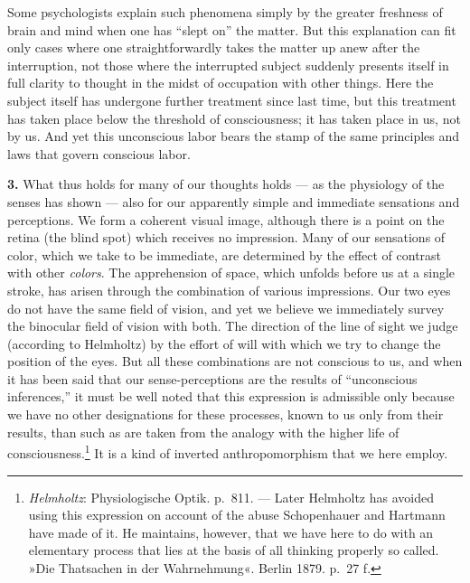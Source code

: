 \documentclass[12pt,a4paper]{book}
\newcommand{\opage}[1]{\marginnote{\footnotesize\textit{[#1]}}}
\begin{document}
Some psychologists explain such phenomena simply by the greater freshness
of brain and mind when one has ``slept on'' the matter. But this
explanation can fit only cases where one straightforwardly takes the
matter up anew after the interruption, not those where the interrupted
subject suddenly presents itself in full clarity to thought in the midst
of occupation with other things. Here the subject itself has undergone
further treatment since last time, but this treatment has taken place
below the threshold of consciousness; it has taken place in us, not by
us. And yet this unconscious labor bears the stamp of the same principles
and laws that govern conscious labor.

\textbf{3.} What thus holds for many of our thoughts holds --- as the
physiology of the senses has shown --- also for our apparently simple and
immediate sensations and perceptions. We form a coherent visual image,
although there is a point on the retina (the blind spot) which receives
no impression. Many of our sensations of color, which we take to be
immediate, are determined by the effect of contrast with other
\emph{colors}. The apprehension of space, which unfolds before us at a
single stroke, has arisen through the combination of various impressions.
Our two eyes do not have the same field of vision, and yet we believe we
immediately survey the binocular field of vision with both. The direction
of the line of sight we judge (according to Helmholtz) by the effort of
will with which we try to change the position of the eyes. But all these
combinations are not conscious to us, and when it has been said that our
sense-perceptions are the results of ``unconscious inferences,'' it must
be well noted that this expression is admissible only because we have no
other designations for these processes, known to us only from their
results, than such as are taken from the analogy with
\opage{89}the higher life of consciousness.\footnote{\emph{Helmholtz}:
Physiologische Optik. p.~811. --- Later Helmholtz has avoided using this
expression on account of the abuse Schopenhauer and Hartmann have made of
it. He maintains, however, that we have here to do with an elementary
process that lies at the basis of all thinking properly so called.
»Die Thatsachen in der Wahrnehmung«. Berlin 1879. p.~27 f.} It is a kind
of inverted anthropomorphism that we here employ.
\end{document}
